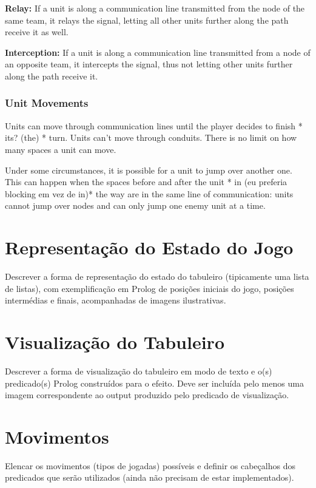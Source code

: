 \documentclass[a4paper]{article}
\begin{document}
\textbf{Relay:} If a unit is along a communication line transmitted from the node of the same team, it relays the signal, letting all other units further along the path receive it as well.

\textbf{Interception:} If a unit is along a communication line transmitted from a node of an opposite team, it intercepts the signal, thus not letting other units further along the path receive it.


\subsubsection{Unit Movements}

Units can move through communication lines until the player decides to finish * its? (the) * turn. Units can't move through conduits. There is no limit on how many spaces a unit can move.


Under some circumstances, it is possible for a unit to jump over another one. This can happen when the spaces before and after the unit * in (eu preferia blocking em vez de in)* the way are in the same line of communication: units cannot jump over nodes and can only jump one enemy unit at a time.




\section{Representação do Estado do Jogo}

Descrever a forma de representação do estado do tabuleiro (tipicamente uma lista de listas), com exemplificação em Prolog de posições iniciais do jogo, posições intermédias e finais, acompanhadas de imagens ilustrativas.


\section{Visualização do Tabuleiro}

Descrever a forma de visualização do tabuleiro em modo de texto e o(s) predicado(s) Prolog construídos para o efeito.
Deve ser incluída pelo menos uma imagem correspondente ao output produzido pelo predicado de visualização.


\section{Movimentos}

Elencar os movimentos (tipos de jogadas) possíveis e definir os cabeçalhos dos predicados que serão utilizados (ainda não precisam de estar implementados).
\end{document}
